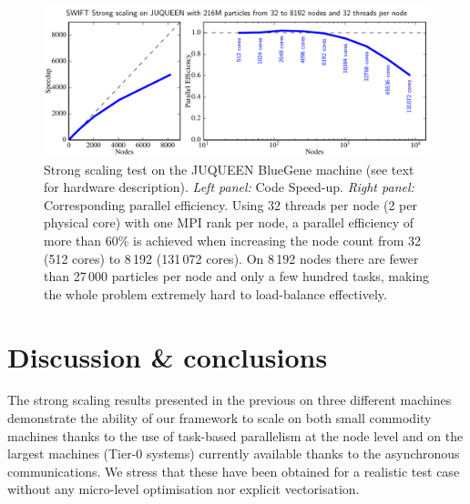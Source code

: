 \documentclass{sig-alternate-05-2015}
\begin{document}
\begin{figure}
\centering
\includegraphics[width=\textwidth]{Figures/scalingBlueGene}
\caption{Strong scaling test on the JUQUEEN BlueGene machine (see text
  for hardware description). \textit{Left panel:} Code
  Speed-up. \textit{Right panel:} Corresponding parallel efficiency.
  Using 32 threads per node (2 per physical core) with one MPI rank
  per node, a parallel efficiency of more than $60\%$ is achieved when
  increasing the node count from 32 (512 cores) to 8\,192 (131\,072
  cores). On 8\,192 nodes there are fewer than 27\,000 particles per
  node and only a few hundred tasks, making the whole problem
  extremely hard to load-balance effectively.
  \label{fig:JUQUEEN2}}
\end{figure}






\section{Discussion \& conclusions}

The strong scaling results presented in the previous on three different machines
demonstrate the ability of our framework to scale on both small commodity
machines thanks to the use of task-based parallelism at the node level and on
the largest machines (Tier-0 systems) currently available thanks to the
asynchronous communications. We stress that these have been obtained for a
realistic test case without any micro-level optimisation nor explicit
vectorisation.
\end{document}
